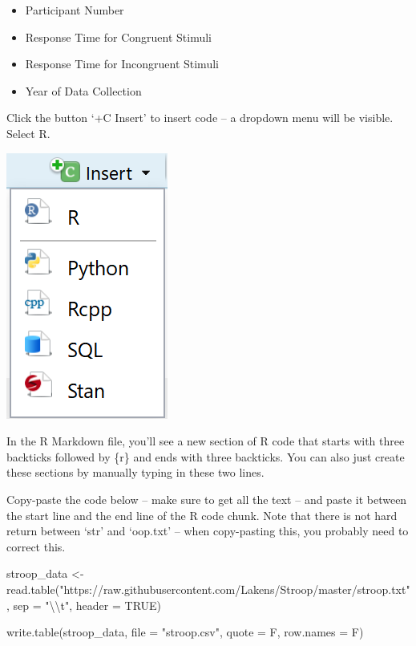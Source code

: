 \documentclass[
  oneside]{book}
\newenvironment{Shaded}{\begin{snugshade}}{\end{snugshade}}
\newcommand{\AttributeTok}[1]{\textcolor[rgb]{0.77,0.63,0.00}{#1}}
\newcommand{\ConstantTok}[1]{\textcolor[rgb]{0.00,0.00,0.00}{#1}}
\newcommand{\FunctionTok}[1]{\textcolor[rgb]{0.00,0.00,0.00}{#1}}
\newcommand{\NormalTok}[1]{#1}
\newcommand{\OtherTok}[1]{\textcolor[rgb]{0.56,0.35,0.01}{#1}}
\newcommand{\SpecialCharTok}[1]{\textcolor[rgb]{0.00,0.00,0.00}{#1}}
\newcommand{\StringTok}[1]{\textcolor[rgb]{0.31,0.60,0.02}{#1}}
\begin{document}
\begin{itemize}
\item
  Participant Number
\item
  Response Time for Congruent Stimuli
\item
  Response Time for Incongruent Stimuli
\item
  Year of Data Collection
\end{itemize}

Click the button `+C Insert' to insert code -- a dropdown menu will be visible.
Select R.

\begin{center}\includegraphics[width=0.5\linewidth]{images/2f929ee323a9f222c85675f5fc45672f} \end{center}

In the R Markdown file, you'll see a new section of R code that starts with
three backticks followed by \{r\} and ends with three backticks. You can also just create these sections by
manually typing in these two lines.

Copy-paste the code below -- make sure to get all the text -- and paste it between
the start line and the end line of the R code chunk. Note that
there is not hard return between `str' and `oop.txt' -- when copy-pasting this,
you probably need to correct this.

\begin{Shaded}
\begin{Highlighting}[]
\NormalTok{stroop\_data }\OtherTok{\textless{}{-}} \FunctionTok{read.table}\NormalTok{(}\StringTok{"https://raw.githubusercontent.com/Lakens/Stroop/master/stroop.txt"}\NormalTok{,}
\AttributeTok{sep =} \StringTok{"}\SpecialCharTok{\textbackslash{}\textbackslash{}}\StringTok{t"}\NormalTok{, }\AttributeTok{header =} \ConstantTok{TRUE}\NormalTok{)}\StringTok{\textasciigrave{}}

\AttributeTok{write.table(stroop\_data, file = "stroop.csv", quote = F, row.names = F)}
\end{Highlighting}
\end{Shaded}
\end{document}
